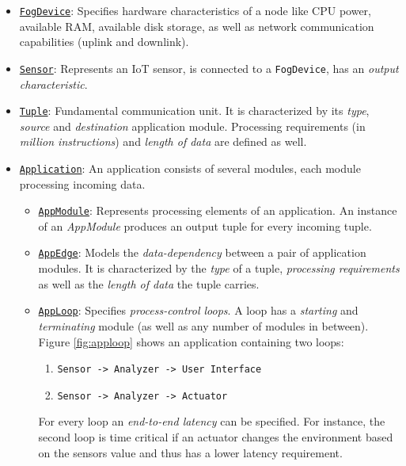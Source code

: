 \begin{itemize}
    \item \underline{\texttt{FogDevice}}: Specifies hardware characteristics of a node like CPU power, available RAM, available disk storage, as well as network communication capabilities (uplink and downlink).
    
    \item \underline{\texttt{Sensor}}: Represents an IoT sensor, is connected to a \texttt{FogDevice}, has an \textit{output characteristic}.
    
    \item \underline{\texttt{Tuple}}: Fundamental communication unit. It is characterized by its \textit{type}, \textit{source} and \textit{destination} application module. Processing requirements (in \textit{million instructions}) and \textit{length of data} are defined as well. 
    
    \item \underline{\texttt{Application}}: An application consists of several modules, each module processing incoming data.
    \begin{itemize}
        \item \underline{\texttt{AppModule}}: Represents processing elements of an application. An instance of an \textit{AppModule} produces an output tuple for every incoming tuple.
        
        \item \underline{\texttt{AppEdge}}: Models the \textit{data-dependency} between a pair of application modules. It is characterized by the \textit{type} of a tuple, \textit{processing requirements} as well as the \textit{length of data} the tuple carries.
        
        \item \underline{\texttt{AppLoop}}: Specifies \textit{process-control loops}. A loop has a \textit{starting} and \textit{terminating} module (as well as any number of modules in between). Figure \ref{fig:apploop} shows an application containing two loops: \begin{enumerate}
            \item \texttt{Sensor -> Analyzer -> User Interface}
            \item \texttt{Sensor -> Analyzer -> Actuator}
        \end{enumerate}
        For every loop an \textit{end-to-end latency} can be specified. For instance, the second loop is time critical if an actuator changes the environment based on the sensors value and thus has a lower latency requirement.
    \end{itemize}
\end{itemize}

